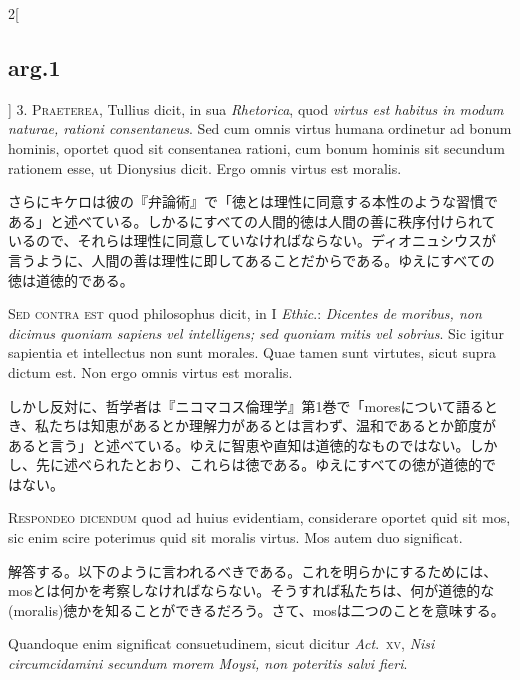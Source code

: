 \documentclass[paper=a4paper,fontsize=10pt,jafontsize=9pt,titlepage]{jlreq}
\begin{document}
\begin{paracol}{2}[\subsection{arg.1}]
3. {\scshape Praeterea}, Tullius dicit, in sua {\itshape Rhetorica},
quod {\itshape virtus est habitus in modum naturae, rationi
consentaneus}. Sed cum omnis virtus humana ordinetur ad bonum hominis,
oportet quod sit consentanea rationi, cum bonum hominis sit secundum
rationem esse, ut Dionysius dicit. Ergo omnis virtus est moralis.

\switchcolumn

さらにキケロは彼の『弁論術』で「徳とは理性に同意する本性のような習慣で
ある」と述べている。しかるにすべての人間的徳は人間の善に秩序付けられて
いるので、それらは理性に同意していなければならない。ディオニュシウスが
言うように、人間の善は理性に即してあることだからである。ゆえにすべての
徳は道徳的である。

\switchcolumn*[\subsection{s.c.}]

{\scshape Sed contra est} quod philosophus dicit, in I {\itshape
Ethic}.: {\itshape Dicentes de moribus, non dicimus quoniam sapiens
vel intelligens; sed quoniam mitis vel sobrius}. Sic igitur sapientia
et intellectus non sunt morales. Quae tamen sunt virtutes, sicut supra
dictum est. Non ergo omnis virtus est moralis.

\switchcolumn

しかし反対に、哲学者は『ニコマコス倫理学』第1巻で「moresについて語ると
き、私たちは知恵があるとか理解力があるとは言わず、温和であるとか節度が
あると言う」と述べている。ゆえに智恵や直知は道徳的なものではない。しか
し、先に述べられたとおり、これらは徳である。ゆえにすべての徳が道徳的で
はない。


{\scshape Respondeo dicendum} quod ad huius evidentiam, considerare
oportet quid sit mos, sic enim scire poterimus quid sit moralis
virtus. Mos autem duo significat.

\switchcolumn

解答する。以下のように言われるべきである。これを明らかにするためには、
mosとは何かを考察しなければならない。そうすれば私たちは、何が道徳的な
(moralis)徳かを知ることができるだろう。さて、mosは二つのことを意味する。

\switchcolumn*

Quandoque enim significat consuetudinem, sicut dicitur {\itshape
Act}.~{\scshape xv}, {\itshape Nisi circumcidamini secundum morem
Moysi, non poteritis salvi fieri}.


\end{paracol}
\end{document}
